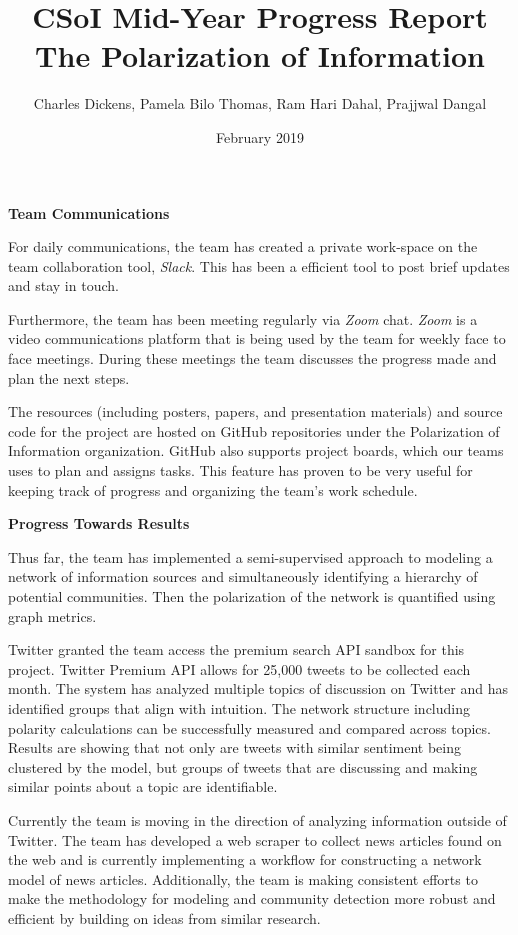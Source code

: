 \documentclass{article}
\title{CSoI Mid-Year Progress Report\\
The Polarization of Information}
\author{Charles Dickens, Pamela Bilo Thomas, Ram Hari Dahal, Prajjwal Dangal}
\date{February 2019}
\begin{document}
\maketitle

\par \noindent \textbf{Team Communications}

\par For daily communications, the team has created a private work-space on the team collaboration tool, \textit{Slack}. This has been a efficient tool to post brief updates and stay in touch. 
\par Furthermore, the team has been meeting regularly via \textit{Zoom} chat. \textit{Zoom} is a video communications platform that is being used by the team for weekly face to face meetings. During these meetings the team discusses the progress made and plan the next steps.
\par The resources (including posters, papers, and presentation materials) and source code for the project are hosted on GitHub repositories under the Polarization of Information organization. GitHub also supports project boards, which our teams uses to plan and assigns tasks. This feature has proven to be very useful for keeping track of progress and organizing the team's work schedule. 

\vspace{0.5cm}

\par \noindent \textbf{Progress Towards Results}

\par Thus far, the team has implemented a semi-supervised approach to modeling a network of information sources and simultaneously identifying a hierarchy of potential communities. Then the polarization of the network is quantified using graph metrics.

\par Twitter granted the team access the premium search API sandbox for this project. Twitter Premium API allows for 25,000 tweets to be collected each month. The system has analyzed multiple topics of discussion on Twitter and has identified groups that align with intuition. The network structure including polarity calculations can be successfully measured and compared across topics. Results are showing that not only are tweets with similar sentiment being clustered by the model, but groups of tweets that are discussing and making similar points about a topic are identifiable.  

\par Currently the team is moving in the direction of analyzing information outside of Twitter. The team has developed a web scraper to collect news articles found on the web and is currently implementing a workflow for constructing a network model of news articles. Additionally, the team is making consistent efforts to make the methodology for modeling and community detection more robust and efficient by building on ideas from similar research. 
\end{document}
